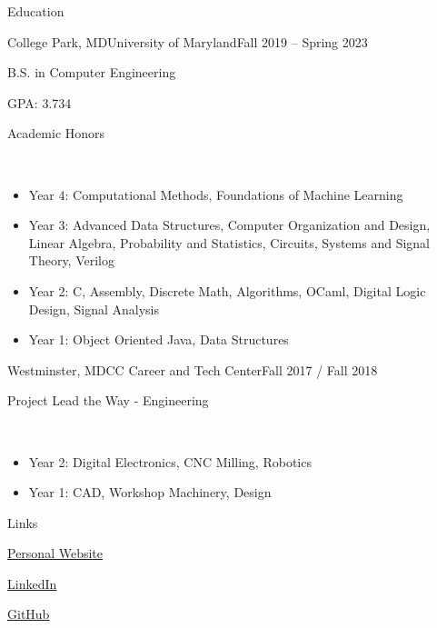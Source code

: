 \documentclass[]{mcdowellcv}
\begin{document}
	\begin{cvsection}{Education}
		\begin{cvsubsection}{College Park, MD}{University of Maryland}{Fall 2019 -- Spring 2023}
      \begin{center}
        \begin{itemize*}
          \item B.S. in Computer Engineering
          \item GPA: 3.734
          \item Academic Honors
          \item ~
        \end{itemize*}
      \end{center}
			\begin{itemize}
        \item Year 4: Computational Methods, Foundations of Machine Learning
        \item Year 3: Advanced Data Structures, Computer Organization and Design, Linear Algebra, Probability and Statistics, %
        Circuits, Systems and Signal Theory, Verilog
        \item Year 2: C, Assembly, Discrete Math, Algorithms, OCaml, Digital Logic Design, Signal Analysis
        \item Year 1: Object Oriented Java, Data Structures
			\end{itemize}
		\end{cvsubsection}
    \begin{cvsubsection}{Westminster, MD}{CC Career and Tech Center}{Fall 2017 / Fall 2018}
      \begin{center}
        \begin{itemize*}
          \item Project Lead the Way - Engineering
          \item ~
        \end{itemize*}
      \end{center}
			\begin{itemize}
        \item Year 2: Digital Electronics, CNC Milling, Robotics
        \item Year 1: CAD, Workshop Machinery, Design
			\end{itemize}
		\end{cvsubsection}
	\end{cvsection}

  \begin{cvsection}{Links}
    \begin{cvsubsection}{}{}{}	
      \begin{itemize*}
        \item {\color{blue}\underline{\href{https://terpconnect.umd.edu/~ryane3/}{Personal Website}}}
        \item {\color{blue}\underline{\href{https://www.linkedin.com/in/ryan-elliott-04a31721b/}{LinkedIn}}}
        \item {\color{blue}\underline{\href{https://github.com/rce3986}{GitHub}}}
      \end{itemize*}
    \end{cvsubsection}
  \end{cvsection}
\end{document}
